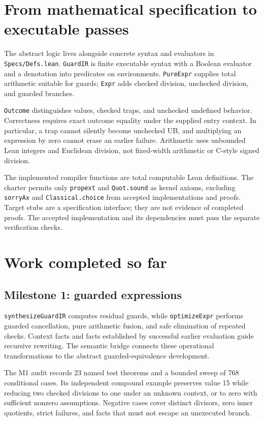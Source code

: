 \documentclass[11pt]{article}
\begin{document}
\section*{From mathematical specification to executable passes}

The abstract logic lives alongside concrete syntax and evaluators in \texttt{Specs/Defs.lean}. \texttt{GuardIR} is finite executable syntax with a Boolean evaluator and a denotation into predicates on environments. \texttt{PureExpr} supplies total arithmetic suitable for guards; \texttt{Expr} adds checked division, unchecked division, and guarded branches.

\texttt{Outcome} distinguishes values, checked traps, and unchecked undefined behavior. Correctness requires exact outcome equality under the supplied entry context. In particular, a trap cannot silently become unchecked UB, and multiplying an expression by zero cannot erase an earlier failure. Arithmetic uses unbounded Lean integers and Euclidean division, not fixed-width arithmetic or C-style signed division.

The implemented compiler functions are total computable Lean definitions. The charter permits only \texttt{propext} and \texttt{Quot.sound} as kernel axioms, excluding \texttt{sorryAx} and \texttt{Classical.choice} from accepted implementations and proofs. Target stubs are a specification interface; they are not evidence of completed proofs. The accepted implementation and its dependencies must pass the separate verification checks.

\section*{Work completed so far}

\subsection*{Milestone 1: guarded expressions}

\texttt{synthesizeGuardIR} computes residual guards, while \texttt{optimizeExpr} performs guarded cancellation, pure arithmetic fusion, and safe elimination of repeated checks. Context facts and facts established by successful earlier evaluation guide recursive rewriting. The semantic bridge connects these operational transformations to the abstract guarded-equivalence development.

The M1 audit records 23 named test theorems and a bounded sweep of 768 conditional cases. Its independent compound example preserves value 15 while reducing two checked divisions to one under an unknown context, or to zero with sufficient nonzero assumptions. Negative cases cover distinct divisors, zero inner quotients, strict failures, and facts that must not escape an unexecuted branch.
\end{document}
